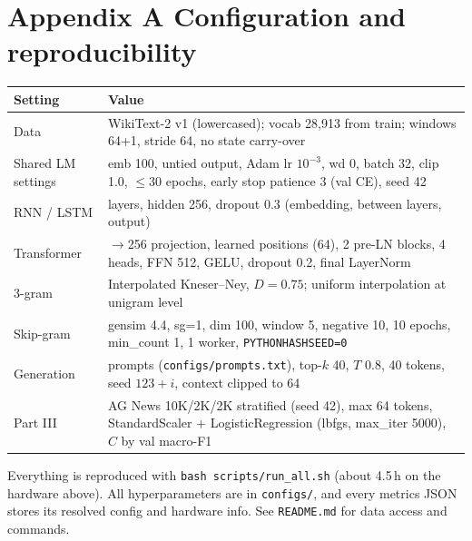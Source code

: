 \documentclass[10pt,a4paper]{article}
\begin{document}
\section*{Appendix A \quad Configuration and reproducibility}
\begin{table}[h]
\centering\small
\begin{tabularx}{\linewidth}{@{}l>{\raggedright\arraybackslash}X@{}}
\toprule
Setting & Value \\
\midrule
Data & WikiText-2 v1 (lowercased); vocab 28,913 from train; windows 64+1, stride 64, no state carry-over \\
Shared LM settings & emb 100, untied output, Adam lr $10^{-3}$, wd 0, batch 32, clip 1.0, $\le$30 epochs, early stop patience 3 (val CE), seed 42 \\
RNN / LSTM & 2 layers, hidden 256, dropout 0.3 (embedding, between layers, output) \\
Transformer & 100$\to$256 projection, learned positions (64), 2 pre-LN blocks, 4 heads, FFN 512, GELU, dropout 0.2, final LayerNorm \\
3-gram & Interpolated Kneser--Ney, $D=0.75$; uniform interpolation at unigram level \\
Skip-gram & gensim 4.4, sg=1, dim 100, window 5, negative 10, 10 epochs, min\_count 1, 1 worker, \texttt{PYTHONHASHSEED=0} \\
Generation & 5 prompts (\texttt{configs/prompts.txt}), top-$k$ 40, $T$ 0.8, 40 tokens, seed $123+i$, context clipped to 64 \\
Part III & AG News 10K/2K/2K stratified (seed 42), max 64 tokens, StandardScaler + LogisticRegression (lbfgs, max\_iter 5000), $C$ by val macro-F1 \\
\bottomrule
\end{tabularx}
\end{table}
{\small Everything is reproduced with \texttt{bash scripts/run\_all.sh} (about 4.5\,h on the hardware above). All hyperparameters are in \texttt{configs/}, and every metrics JSON stores its resolved config and hardware info. See \texttt{README.md} for data access and commands.}
\end{document}
